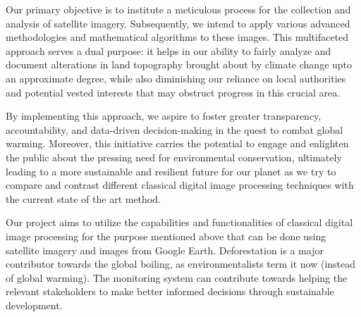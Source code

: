 \documentclass[12pt,a4paper,IEEEtran]{article}
\begin{document}
Our primary objective is to institute a meticulous process for the collection and analysis of satellite imagery. Subsequently, we intend to apply various advanced methodologies and mathematical algorithms to these images. This multifaceted approach serves a dual purpose: it helps in our ability to fairly analyze and document alterations in land topography brought about by climate change upto an approximate degree, while also diminishing our reliance on local authorities and potential vested interests that may obstruct progress in this crucial area.

By implementing this approach, we aspire to foster greater transparency, accountability, and data-driven decision-making in the quest to combat global warming. Moreover, this initiative carries the potential to engage and enlighten the public about the pressing need for environmental conservation, ultimately leading to a more sustainable and resilient future for our planet as we try to compare and contrast different classical digital image processing techniques with the current state of the art method.


Our project aims to utilize the capabilities and functionalities of classical digital image processing for the purpose mentioned above that can be done using satellite imagery and images from Google Earth.
Deforestation is a major contributor towards
the global boiling, as environmentalists term it now (instead of global warming). The monitoring system can contribute towards helping the relevant stakeholders to make better informed decisions through sustainable development. \cite{thomas2023global}
\end{document}
